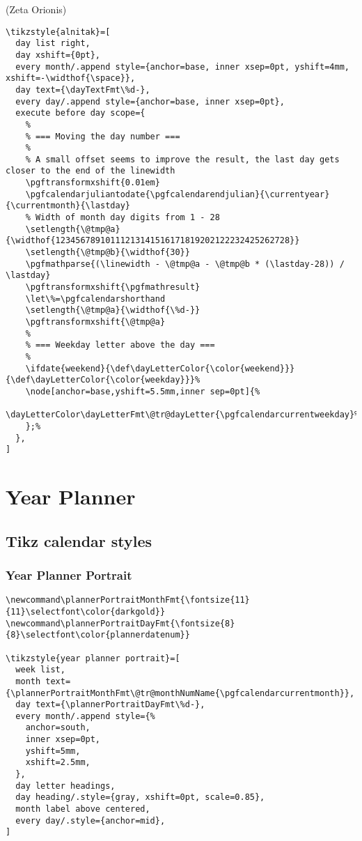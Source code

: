 \documentclass[11pt,oneside]{memoir-article}
\begin{document}
(Zeta Orionis)

\begin{verbatim}
\tikzstyle{alnitak}=[
  day list right,
  day xshift={0pt},
  every month/.append style={anchor=base, inner xsep=0pt, yshift=4mm, xshift=-\widthof{\space}},
  day text={\dayTextFmt\%d-},
  every day/.append style={anchor=base, inner xsep=0pt},
  execute before day scope={
    %
    % === Moving the day number ===
    %
    % A small offset seems to improve the result, the last day gets closer to the end of the linewidth
    \pgftransformxshift{0.01em}
    \pgfcalendarjuliantodate{\pgfcalendarendjulian}{\currentyear}{\currentmonth}{\lastday}
    % Width of month day digits from 1 - 28
    \setlength{\@tmp@a}{\widthof{12345678910111213141516171819202122232425262728}}
    \setlength{\@tmp@b}{\widthof{30}}
    \pgfmathparse{(\linewidth - \@tmp@a - \@tmp@b * (\lastday-28)) / \lastday}
    \pgftransformxshift{\pgfmathresult}
    \let\%=\pgfcalendarshorthand
    \setlength{\@tmp@a}{\widthof{\%d-}}
    \pgftransformxshift{\@tmp@a}
    %
    % === Weekday letter above the day ===
    %
    \ifdate{weekend}{\def\dayLetterColor{\color{weekend}}}{\def\dayLetterColor{\color{weekday}}}%
    \node[anchor=base,yshift=5.5mm,inner sep=0pt]{%
      \dayLetterColor\dayLetterFmt\@tr@dayLetter{\pgfcalendarcurrentweekday}%
    };%
  },
]
\end{verbatim}

\chapter{Year Planner}
\label{sec:orga565cf5}
\section{Tikz calendar styles}
\label{sec:org8a087db}
\subsection{Year Planner Portrait}
\label{sec:orgb196945}

\begin{verbatim}
\newcommand\plannerPortraitMonthFmt{\fontsize{11}{11}\selectfont\color{darkgold}}
\newcommand\plannerPortraitDayFmt{\fontsize{8}{8}\selectfont\color{plannerdatenum}}

\tikzstyle{year planner portrait}=[
  week list,
  month text={\plannerPortraitMonthFmt\@tr@monthNumName{\pgfcalendarcurrentmonth}},
  day text={\plannerPortraitDayFmt\%d-},
  every month/.append style={%
    anchor=south,
    inner xsep=0pt,
    yshift=5mm,
    xshift=2.5mm,
  },
  day letter headings,
  day heading/.style={gray, xshift=0pt, scale=0.85},
  month label above centered,
  every day/.style={anchor=mid},
]
\end{verbatim}
\end{document}
